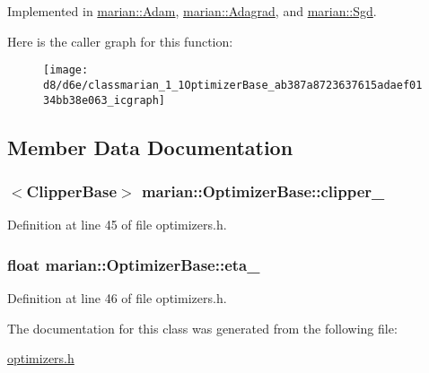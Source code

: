 Implemented in \hyperlink{classmarian_1_1Adam_a8134d893e68d1be18ea2cdcc98994f56}{marian\+::\+Adam}, \hyperlink{classmarian_1_1Adagrad_abba8d5d6bb96ff15f4f956f185c7887a}{marian\+::\+Adagrad}, and \hyperlink{classmarian_1_1Sgd_a8a74cc7115e1aafcb67d013b37c8f1ec}{marian\+::\+Sgd}.



Here is the caller graph for this function\+:
\nopagebreak
\begin{figure}[H]
\begin{center}
\leavevmode
\texttt{[image: d8/d6e/classmarian\_1\_1OptimizerBase\_ab387a8723637615adaef0134bb38e063\_icgraph]}
\end{center}
\end{figure}




\subsection{Member Data Documentation}
\subsubsection[{\texorpdfstring{clipper\+\_\+}{clipper_}}]{$<${\bf Clipper\+Base}$>$ marian\+::\+Optimizer\+Base\+::clipper\+\_\+\hspace{0.3cm}{\ttfamily [protected]}}\hypertarget{classmarian_1_1OptimizerBase_ac2a86cf5b8691476b891c9a9df99218d}{}\label{classmarian_1_1OptimizerBase_ac2a86cf5b8691476b891c9a9df99218d}


Definition at line 45 of file optimizers.\+h.

\subsubsection[{\texorpdfstring{eta\+\_\+}{eta_}}]{\setlength{\rightskip}{0pt plus 5cm}float marian\+::\+Optimizer\+Base\+::eta\+\_\+\hspace{0.3cm}{\ttfamily [protected]}}\hypertarget{classmarian_1_1OptimizerBase_a3ef582b12fb6816fb26d0eb8f697e204}{}\label{classmarian_1_1OptimizerBase_a3ef582b12fb6816fb26d0eb8f697e204}


Definition at line 46 of file optimizers.\+h.



The documentation for this class was generated from the following file\+:\begin{DoxyCompactItemize}
\item 
\hyperlink{optimizers_8h}{optimizers.\+h}\end{DoxyCompactItemize}
